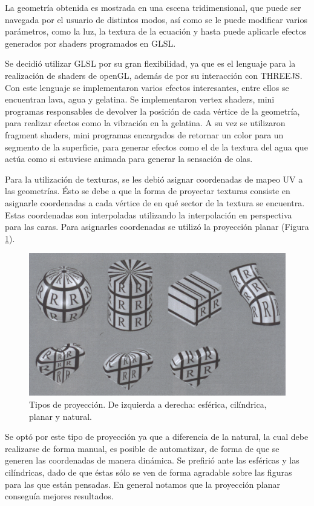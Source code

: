 \documentclass[12pt]{article}
\begin{document}
La geometría obtenida es mostrada en una escena tridimensional, que puede ser navegada por el usuario de distintos modos, así como se le puede modificar varios parámetros, como la luz, la textura de la ecuación y hasta puede aplicarle efectos generados por shaders programados en GLSL.

Se decidió utilizar GLSL por su gran flexibilidad, ya que es el lenguaje para la realización de shaders de openGL, además de por su interacción con THREEJS. Con este lenguaje se implementaron varios efectos interesantes, entre ellos se encuentran lava, agua y gelatina.  Se implementaron vertex shaders, mini programas responsables de devolver la posición de cada vértice de la geometría, para realizar efectos como la vibración en la gelatina. A su vez se utilizaron fragment shaders, mini programas encargados de retornar un color para un segmento de la superficie, para generar efectos como el de la textura del agua que actúa como si estuviese animada para generar la sensación de olas.

Para la utilización de texturas, se les debió asignar coordenadas de mapeo UV a las geometrías. Ésto se debe a que la forma de proyectar texturas consiste en asignarle coordenadas a cada vértice de en qué sector de la textura se encuentra. Estas coordenadas son interpoladas utilizando la interpolación en perspectiva para las caras\cite{realtimerendering}\cite{engine}. Para asignarles coordenadas se utilizó la proyección planar\cite{realtimerendering} (Figura \ref{texturas}).
\begin{figure}[h!]
\includegraphics[width =0.7\linewidth, center]{proyecciones.png}
\caption{Tipos de proyección. De izquierda a derecha: esférica, cilíndrica, planar y natural.}
\label{texturas}
\end{figure}

Se optó por este tipo de proyección ya que a diferencia de la natural, la cual debe realizarse de forma manual, es posible de automatizar, de forma de que se generen las coordenadas de manera dinámica. Se prefirió ante las esféricas y las cilíndricas, dado de que éstas sólo se ven de forma agradable sobre las figuras para las que están pensadas. En general notamos que la proyección planar conseguía mejores resultados. 
\end{document}
